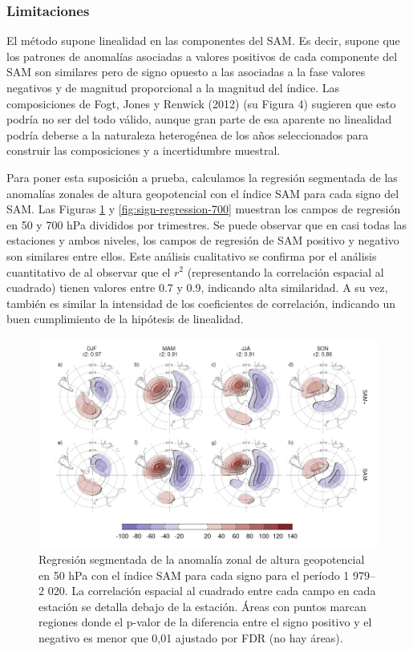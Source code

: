 \documentclass[12pt,oneside,a4paper]{reedthesis}
\begin{document}
\hypertarget{limitaciones}{%
\subsubsection{Limitaciones}\label{limitaciones}}

El método supone linealidad en las componentes del SAM.
Es decir, supone que los patrones de anomalías asociadas a valores positivos de cada componente del SAM son similares pero de signo opuesto a las asociadas a la fase valores negativos y de magnitud proporcional a la magnitud del índice.
Las composiciones de Fogt, Jones y Renwick (2012) (su Figura 4) sugieren que esto podría no ser del todo válido, aunque gran parte de esa aparente no linealidad podría deberse a la naturaleza heterogénea de los años seleccionados para construir las composiciones y a incertidumbre muestral.

Para poner esta suposición a prueba, calculamos la regresión segmentada de las anomalías zonales de altura geopotencial con el índice SAM para cada signo del SAM.
Las Figuras \ref{fig:sign-regression-50} y \ref{fig:sign-regression-700} muestran los campos de regresión en 50 y 700 hPa divididos por trimestres.
Se puede observar que en casi todas las estaciones y ambos niveles, los campos de regresión de SAM positivo y negativo son similares entre ellos.
Este análisis cualitativo se confirma por el análisis cuantitativo de al observar que el \(r^2\) (representando la correlación espacial al cuadrado) tienen valores entre 0.7 y 0.9, indicando alta similaridad.
A su vez, también es similar la intensidad de los coeficientes de correlación, indicando un buen cumplimiento de la hipótesis de linealidad.



\begin{figure}

{\centering \includegraphics{figures/30-sam/sign-regression-50-1} 

}

\caption{Regresión segmentada de la anomalía zonal de altura geopotencial en 50 hPa con el índice SAM para cada signo para el período 1 979--2 020. La correlación espacial al cuadrado entre cada campo en cada estación se detalla debajo de la estación. Áreas con puntos marcan regiones donde el p-valor de la diferencia entre el signo positivo y el negativo es menor que 0,01 ajustado por FDR (no hay áreas).}\label{fig:sign-regression-50}
\end{figure}
\end{document}
